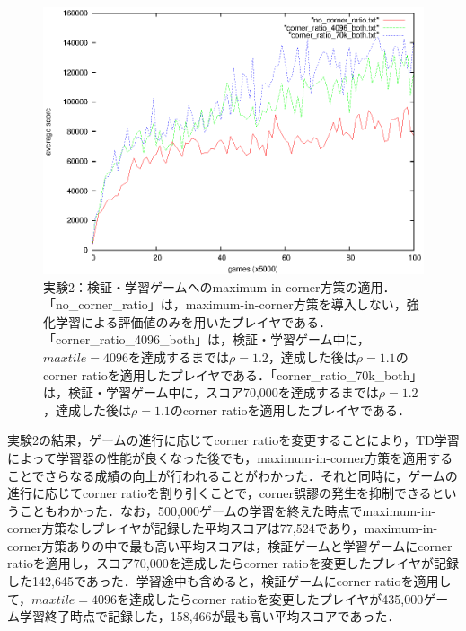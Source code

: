 \documentclass{suribt}
\begin{document}
\begin{figure}[tb]
	\begin{center}
	\includegraphics[width=13cm]{figure_009.eps}
	\caption{実験2：検証・学習ゲームへのmaximum-in-corner方策の適用．「no\_corner\_ratio」は，maximum-in-corner方策を導入しない，強化学習による評価値のみを用いたプレイヤである．「corner\_ratio\_4096\_both」は，検証・学習ゲーム中に，$maxtile=4096$を達成するまでは${\rho}=1.2$，達成した後は${\rho}=1.1$のcorner ratioを適用したプレイヤである．「corner\_ratio\_70k\_both」は，検証・学習ゲーム中に，スコア70,000を達成するまでは${\rho}=1.2$，達成した後は${\rho}=1.1$のcorner ratioを適用したプレイヤである．}
	\label{figure_009}
	\end{center}
\end{figure}

実験2の結果，ゲームの進行に応じてcorner ratioを変更することにより，TD学習によって学習器の性能が良くなった後でも，maximum-in-corner方策を適用することでさらなる成績の向上が行われることがわかった．それと同時に，ゲームの進行に応じてcorner ratioを割り引くことで，corner誤謬の発生を抑制できるということもわかった．なお，500,000ゲームの学習を終えた時点でmaximum-in-corner方策なしプレイヤが記録した平均スコアは77,524であり，maximum-in-corner方策ありの中で最も高い平均スコアは，検証ゲームと学習ゲームにcorner ratioを適用し，スコア70,000を達成したらcorner ratioを変更したプレイヤが記録した142,645であった．学習途中も含めると，検証ゲームにcorner ratioを適用して，$maxtile=4096$を達成したらcorner ratioを変更したプレイヤが435,000ゲーム学習終了時点で記録した，158,466が最も高い平均スコアであった．
\end{document}
